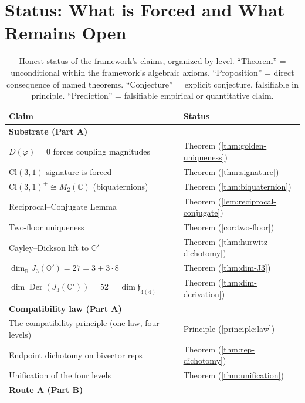 \documentclass[11pt,a4paper]{article}
\theoremstyle{plain}
\theoremstyle{definition}
\theoremstyle{remark}
\numberwithin{equation}{section}
\providecommand{\Cl}{\mathrm{Cl}}
\providecommand{\R}{\mathbb{R}}
\providecommand{\C}{\mathbb{C}}
\providecommand{\Os}{\mathbb{O}'}
\providecommand{\vp}{\varphi}
\providecommand{\fk}[1]{\mathfrak{#1}}
\DeclareMathOperator{\Der}{Der}
\begin{document}
\section{Status: What is Forced and What Remains Open}
\label{sec:status}

\begin{table}[ht]
\centering
\caption{Honest status of the framework's claims, organized by
level.  ``Theorem'' = unconditional within the framework's
algebraic axioms.  ``Proposition'' = direct consequence of named
theorems.  ``Conjecture'' = explicit conjecture, falsifiable in
principle.  ``Prediction'' = falsifiable empirical or
quantitative claim.}
\label{tab:status}
\renewcommand{\arraystretch}{1.3}
\small
\begin{tabular}{p{8.5cm} p{5cm}}
\toprule
\textbf{Claim} & \textbf{Status} \\
\midrule
\multicolumn{2}{l}{\textbf{Substrate (Part A)}} \\
$D(\vp) = 0$ forces coupling magnitudes & Theorem (\cref{thm:golden-uniqueness}) \\
$\Cl(3,1)$ signature is forced & Theorem (\cref{thm:signature}) \\
$\Cl(3,1)^+ \cong M_2(\C)$ (biquaternions) & Theorem (\cref{thm:biquaternion}) \\
Reciprocal--Conjugate Lemma & Theorem (\cref{lem:reciprocal-conjugate}) \\
Two-floor uniqueness & Theorem (\cref{cor:two-floor}) \\
Cayley--Dickson lift to $\Os$ & Theorem (\cref{thm:hurwitz-dichotomy}) \\
$\dim_\R J_3(\Os) = 27 = 3 + 3 \cdot 8$ & Theorem (\cref{thm:dim-J3}) \\
$\dim \Der(J_3(\Os)) = 52 = \dim \fk{f}_{4(4)}$ & Theorem (\cref{thm:dim-derivation}) \\
\midrule
\multicolumn{2}{l}{\textbf{Compatibility law (Part A)}} \\
The compatibility principle (one law, four levels) & Principle (\cref{principle:law}) \\
Endpoint dichotomy on bivector reps & Theorem (\cref{thm:rep-dichotomy}) \\
Unification of the four levels & Theorem (\cref{thm:unification}) \\
\midrule
\multicolumn{2}{l}{\textbf{Route A (Part B)}} \\

\end{tabular}
\end{table}
\end{document}
